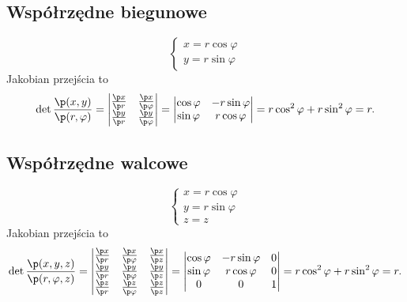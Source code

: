 \subsection*{Współrzędne biegunowe}
\begin{equation} \begin{cases}
    x = r \cos\varphi \\
    y = r \sin\varphi
\end{cases} \end{equation}
Jakobian przejścia to
\[ \det \frac{\p (x, y)}{\p (r, \varphi)} = \begin{vmatrix}
    \frac{\p x}{\p r} & \frac{\p x}{\p \varphi} \\
    \frac{\p y}{\p r} & \frac{\p y}{\p \varphi}
\end{vmatrix} = \begin{vmatrix}
    \cos\varphi & -r\sin\varphi \\
    \sin\varphi & r\cos\varphi
\end{vmatrix} = r\cos^2\varphi + r\sin^2\varphi = r. \]

\subsection*{Współrzędne walcowe}
\begin{equation} \begin{cases}
    x = r \cos\varphi \\
    y = r \sin\varphi \\
    z = z
\end{cases} \end{equation}
Jakobian przejścia to
\[ \det \frac{\p (x, y, z)}{\p (r, \varphi, z)} = \begin{vmatrix}
    \frac{\p x}{\p r} & \frac{\p x}{\p \varphi} & \frac{\p x}{\p z} \\
    \frac{\p y}{\p r} & \frac{\p y}{\p \varphi} & \frac{\p y}{\p z} \\
    \frac{\p z}{\p r} & \frac{\p z}{\p \varphi} & \frac{\p z}{\p z}
\end{vmatrix} = \begin{vmatrix}
    \cos\varphi & -r\sin\varphi & 0 \\
    \sin\varphi & r\cos\varphi & 0 \\
    0 & 0 & 1
\end{vmatrix} = r\cos^2\varphi + r\sin^2\varphi = r. \]

